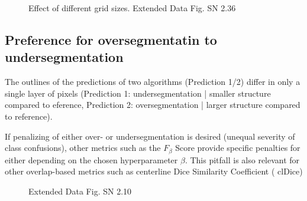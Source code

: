 \documentclass[11pt]{article}
\begin{document}
\begin{figure}[H]
    \centering
    \caption{Effect of different grid sizes. Extended Data Fig. SN 2.36~\cite{pitfalls-in-segmentation-evaluation}}
\end{figure}

\subsection{Preference for oversegmentatin to undersegmentation}

The outlines of the predictions of two algorithms (Prediction 1/2) differ in only a single layer of pixels (Prediction 1: undersegmentation | smaller structure compared to eference, Prediction 2: oversegmentation | larger structure compared to reference).

If penalizing of either over- or undersegmentation is desired (unequal severity of class confusions), other metrics such as the $F_\beta$ Score provide specific penalties for either depending on the chosen hyperparameter $\beta$. This pitfall is also relevant for other overlap-based metrics such as centerline Dice Similarity Coefficient ( clDice)

\begin{figure}[H]
    \centering
    \caption{Extended Data Fig. SN 2.10~\cite{pitfalls-in-segmentation-evaluation}}
\end{figure}
\end{document}
